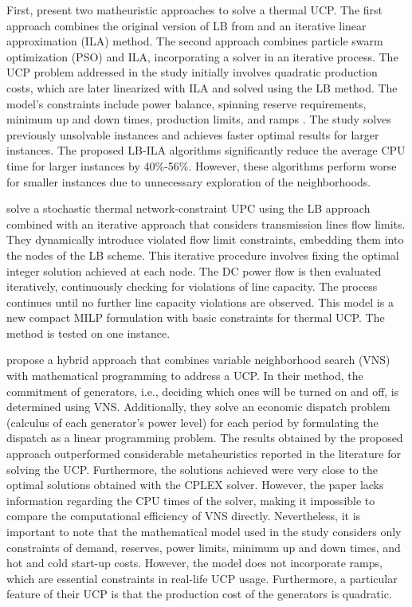 
First, \citet{Fayzur2014} present two matheuristic approaches to solve a thermal UCP. The first approach combines the original version of LB from \citet{Fischetti2003} and an iterative linear approximation (ILA) method. The second approach combines particle swarm optimization (PSO) and ILA, incorporating a solver in an iterative process.
The UCP problem addressed in the study initially involves quadratic production costs, which are later linearized with ILA and solved using the LB method. The model's constraints include power balance, spinning reserve requirements, minimum up and down times, production limits, and ramps \citep{Viana2013}.
The study solves previously unsolvable instances and achieves faster optimal results for larger instances. The proposed LB-ILA algorithms significantly reduce the average CPU time for larger instances by 40\%-56\%. However, these algorithms perform worse for smaller instances due to unnecessary exploration of the neighborhoods.

\citet{Saboia2016} solve a stochastic thermal network-constraint UPC using the LB approach combined with an iterative approach that considers transmission lines flow limits. 
They dynamically introduce violated flow limit constraints, embedding them into the nodes of the LB scheme. This iterative procedure involves fixing the optimal integer solution achieved at each node. The DC power flow is then evaluated iteratively, continuously checking for violations of line capacity. The process continues until no further line capacity violations are observed. This model is a new compact MILP formulation with basic constraints for thermal UCP. The method is tested on one instance.

\citet{Todosijevic2016} propose a hybrid approach that combines variable neighborhood search (VNS) with mathematical programming to address a UCP. 
In their method, the commitment of generators, i.e., deciding which ones will be turned on and off, is determined using VNS. Additionally, they solve an economic dispatch problem (calculus of each generator's power level) for each period by formulating the dispatch as a linear programming problem.
The results obtained by the proposed approach outperformed considerable metaheuristics reported in the literature for solving the UCP. Furthermore, the solutions achieved were very close to the optimal solutions obtained with the CPLEX solver. However, the paper lacks information regarding the CPU times of the solver, making it impossible to compare the computational efficiency of VNS directly.
Nevertheless, it is important to note that the mathematical model used in the study considers only constraints of demand, reserves, power limits, minimum up and down times, and hot and cold start-up costs. However, the model does not incorporate ramps, which are essential constraints in real-life UCP usage. 
Furthermore, a particular feature of their UCP is that the production cost of the generators is quadratic.

